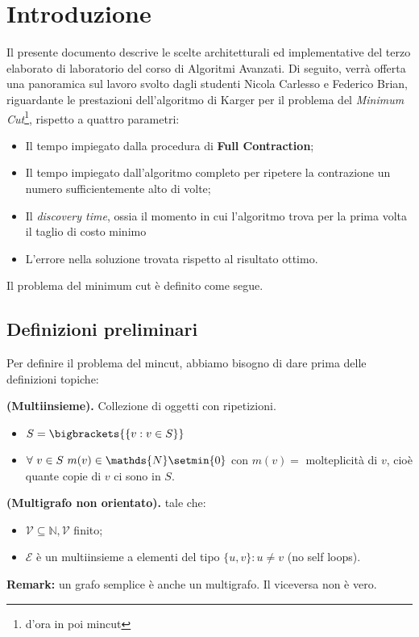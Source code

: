 \section{Introduzione}
Il presente documento descrive le scelte architetturali ed implementative del terzo elaborato di laboratorio del corso di Algoritmi Avanzati. Di seguito, verrà offerta una panoramica sul lavoro svolto dagli studenti Nicola Carlesso e Federico Brian, riguardante le prestazioni dell'algoritmo di Karger per il problema del \emph{Minimum Cut}\footnote{d'ora in poi mincut}, rispetto a quattro parametri:
\begin{itemize}
	\item Il tempo impiegato dalla procedura di \textbf{Full Contraction};
	\item Il tempo impiegato dall'algoritmo completo per ripetere la contrazione un numero sufficientemente alto di volte;
	\item Il \emph{discovery time}, ossia il momento in cui l'algoritmo trova per la prima volta il taglio di costo minimo
	\item L'errore  nella soluzione trovata rispetto al risultato ottimo.
\end{itemize}
Il problema del minimum cut è definito come segue.

\subsection{Definizioni preliminari}
Per definire il problema del mincut, abbiamo bisogno di dare prima delle definizioni topiche:
\begin{defi} \textbf{(Multiinsieme).} Collezione di oggetti con ripetizioni.
\begin{itemize}
	\item $S = \bigbrackets{\{v: v\in S\}}$
	\item $\forall\ v\in S\ m(v)\in\mathds{N}\setmin \{0\}$ con $m(v) = $ molteplicità di $v$, cioè quante copie di $v$ ci sono in $S$.
\end{itemize}
\end{defi}
\begin{defi} \textbf{(Multigrafo non orientato).} \mgrafo tale che:
\begin{itemize}
	\item $\mathcal{V}\subseteq\mathds{N}, \mathcal{V}$ finito;
	\item $\mathcal{E}$ è un multiinsieme a elementi del tipo $\{u,v\} : u\neq v$ (no self loops).
\end{itemize}
\end{defi}
\textbf{Remark:} un grafo semplice \grafo è anche un multigrafo. Il viceversa non è vero.


